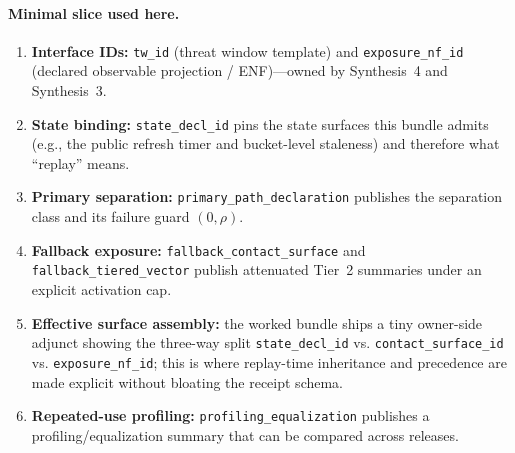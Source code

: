 \documentclass[11pt]{article}
\begin{document}
\paragraph{Minimal slice used here.}
\begin{enumerate}[leftmargin=*]
\item \textbf{Interface IDs:} \texttt{tw\_id} (threat window template) and \texttt{exposure\_nf\_id} (declared observable projection / ENF)---owned by Synthesis~4 and Synthesis~3.\cite{series:threatwindows,series:traceifaces}
\item \textbf{State binding:} \texttt{state\_decl\_id} pins the state surfaces this bundle admits (e.g., the public refresh timer and bucket-level staleness) and therefore what ``replay'' means.\cite{series:planstateequiv}
\item \textbf{Primary separation:} \texttt{primary\_path\_declaration} publishes the separation class and its failure guard $(0,\rho)$.\cite{series:primarysepmanifest,series:probsep}
\item \textbf{Fallback exposure:} \texttt{fallback\_contact\_surface} and \texttt{fallback\_tiered\_vector} publish attenuated Tier~2 summaries under an explicit activation cap.\cite{series:obsatten,series:fallbacktax,series:tieredobs}
\item \textbf{Effective surface assembly:} the worked bundle ships a tiny owner-side adjunct showing the three-way split \texttt{state\_decl\_id} vs. \texttt{contact\_surface\_id} vs. \texttt{exposure\_nf\_id}; this is where replay-time inheritance and precedence are made explicit without bloating the receipt schema.\cite{series:receiptitems,series:deployedsurfaces}
\item \textbf{Repeated-use profiling:} \texttt{profiling\_equalization} publishes a profiling/equalization summary that can be compared across releases.\cite{series:profiling}
\end{enumerate}
\end{document}
